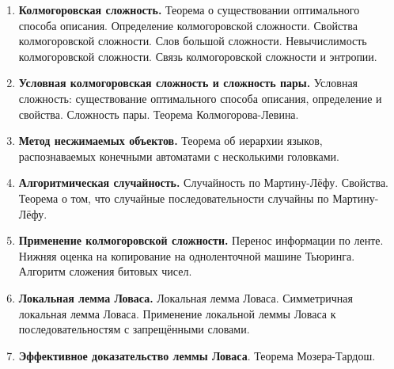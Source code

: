 \documentclass[12pt]{article}
\theoremstyle{definition}
\theoremstyle{plain}
\theoremstyle{remark}
\begin{document}
\begin{enumerate}
	\item \textbf{Колмогоровская сложность.} Теорема о существовании
	оптимального способа описания. Определение колмогоровской сложности.
	Свойства колмогоровской сложности.
	Слов большой сложности. Невычислимость колмогоровской сложности.
	Связь колмогоровской сложности и энтропии. 
	
	\item \textbf{Условная колмогоровская сложность и сложность пары.} 
	Условная сложность: существование оптимального способа описания, определение и свойства. Сложность пары. Теорема Колмогорова-Левина.
	
	\item \textbf{Метод несжимаемых объектов.} Теорема об иерархии
	языков, распознаваемых конечными автоматами 
	с несколькими головками.
	
	\item \textbf{Алгоритмическая случайность.} Случайность по Мартину-Лёфу. Свойства. Теорема о том, что случайные последовательности
	случайны по Мартину-Лёфу.
	
	\item \textbf{Применение колмогоровской сложности.} 
	Перенос информации по ленте. Нижняя оценка на копирование
	на одноленточной машине Тьюринга. 
	Алгоритм сложения битовых чисел.
	
	\item \textbf{Локальная лемма Ловаса.} Локальная лемма Ловаса.
	Симметричная локальная лемма Ловаса. Применение локальной леммы Ловаса
	к последовательностям с запрещёнными словами.
	
	\item \textbf{Эффективное доказательство леммы Ловаса}.
	Теорема Мозера-Тардош.
	
\end{enumerate}
\end{document}
